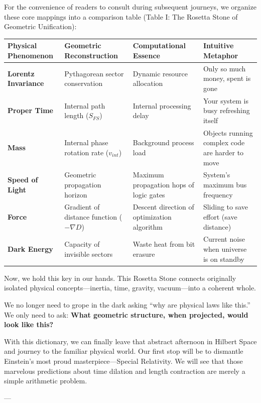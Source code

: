 \documentclass[11pt,a4paper,twoside]{book}
\begin{document}
For the convenience of readers to consult during subsequent journeys, we organize these core mappings into a comparison table (Table I: The Rosetta Stone of Geometric Unification):

\begin{table}[h]
\centering
\begin{tabular}{|l|l|l|l|}
\hline
\textbf{Physical Phenomenon} & \textbf{Geometric Reconstruction} & \textbf{Computational Essence} & \textbf{Intuitive Metaphor} \\
\hline
\textbf{Lorentz Invariance} & Pythagorean sector conservation & Dynamic resource allocation & Only so much money, spent is gone \\
\hline
\textbf{Proper Time} & Internal path length ($S_{FS}$) & Internal processing delay & Your system is busy refreshing itself \\
\hline
\textbf{Mass} & Internal phase rotation rate ($v_{int}$) & Background process load & Objects running complex code are harder to move \\
\hline
\textbf{Speed of Light} & Geometric propagation horizon & Maximum propagation hops of logic gates & System's maximum bus frequency \\
\hline
\textbf{Force} & Gradient of distance function ($-\nabla D$) & Descent direction of optimization algorithm & Sliding to save effort (save distance) \\
\hline
\textbf{Dark Energy} & Capacity of invisible sectors & Waste heat from bit erasure & Current noise when universe is on standby \\
\hline
\end{tabular}
\end{table}

Now, we hold this key in our hands. This Rosetta Stone connects originally isolated physical concepts---inertia, time, gravity, vacuum---into a coherent whole.

We no longer need to grope in the dark asking ``why are physical laws like this.'' We only need to ask: \textbf{What geometric structure, when projected, would look like this?}

With this dictionary, we can finally leave that abstract afternoon in Hilbert Space and journey to the familiar physical world. Our first stop will be to dismantle Einstein's most proud masterpiece---Special Relativity. We will see that those marvelous predictions about time dilation and length contraction are merely a simple arithmetic problem.

---
\end{document}
